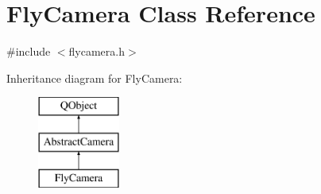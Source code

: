 \hypertarget{class_fly_camera}{}\section{Fly\+Camera Class Reference}
\label{class_fly_camera}


{\ttfamily \#include $<$flycamera.\+h$>$}

Inheritance diagram for Fly\+Camera\+:\begin{figure}[H]
\begin{center}
\leavevmode
\includegraphics[height=3.000000cm]{class_fly_camera}
\end{center}
\end{figure}
